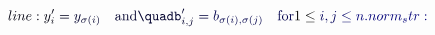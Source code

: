 \documentclass[12pt]{article}
\begin{document}
\makeatletter
\renewcommand*{\@textcolor}[3]{%
  \protect\leavevmode
  \begingroup
    \color#1{#2}#3%
  \endgroup
}
\makeatother
\begin{displaymath}
\mathcolor[RGB]{0,0,15}{line:
y_i'} \mathcolor[RGB]{0,0,30}{=} \mathcolor[RGB]{0,0,45}{y_{\sigma(i)}\quad\text{and}\quadb_{i,j}'} \mathcolor[RGB]{0,0,60}{=} \mathcolor[RGB]{0,0,75}{b_{\sigma(i),\sigma(j)}\quad\text{for} }1\le \mathcolor[RGB]{0,0,90}{i,j} \mathcolor[RGB]{0,0,105}{\le} \mathcolor[RGB]{0,0,120}{n.

norm_str:}
\end{displaymath}
\end{document}
